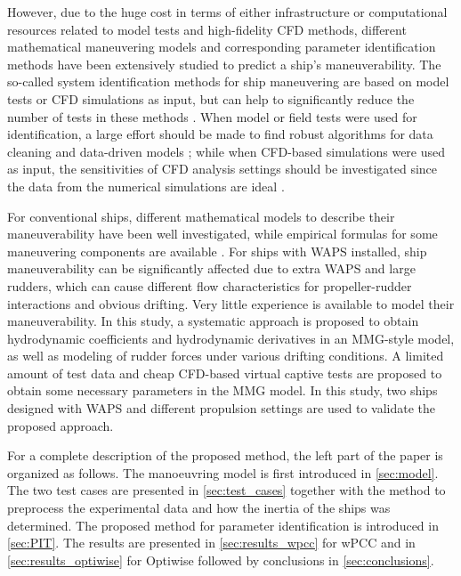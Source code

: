 However, due to the huge cost in terms of either infrastructure or computational resources related to model tests and high-fidelity CFD methods, different mathematical maneuvering models and corresponding parameter identification methods have been extensively studied to predict a ship’s maneuverability. The so-called system identification methods for ship maneuvering are based on model tests or CFD simulations as input, but can help to significantly reduce the number of tests in these methods \citep{lokukalugep.pereraSystemIdentificationVessel2016,alexanderssonSystemIdentificationPhysicsinformed2024b}. When model or field tests were used for identification, a large effort should be made to find robust algorithms for data cleaning and data-driven models \citep{revestidoherreroTwostepIdentificationNonlinear2012,alexanderssonSystemIdentificationVessel2022,duShipManeuveringPrediction2022}; while when CFD-based simulations were used as input, the sensitivities of CFD analysis settings should be investigated since the data from the numerical simulations are ideal \citep{liuPredictionsShipManeuverability2018}.

For conventional ships, different mathematical models to describe their maneuverability have been well investigated, while empirical formulas for some maneuvering components are available \citep{yasukawaIntroductionMMGStandard2015}. For ships with WAPS installed, ship maneuverability can be significantly affected due to extra WAPS and large rudders, which can cause different flow characteristics for propeller-rudder interactions and obvious drifting. Very little experience is available to model their maneuverability. In this study, a systematic approach is proposed to obtain hydrodynamic coefficients and hydrodynamic derivatives in an MMG-style model, as well as modeling of rudder forces under various drifting conditions. A limited amount of test data and cheap CFD-based virtual captive tests are proposed to obtain some necessary parameters in the MMG model. In this study, two ships designed with WAPS and different propulsion settings are used to validate the proposed approach. 

For a complete description of the proposed method, the left part of the paper is organized as follows. 
The manoeuvring model is first introduced in \autoref{sec:model}. The two test cases are presented in \autoref{sec:test_cases} together with the method to preprocess the experimental data and how the inertia of the ships was determined. The proposed method for parameter identification is introduced in \autoref{sec:PIT}. The results are presented in \autoref{sec:results_wpcc} for wPCC and in \autoref{sec:results_optiwise} for Optiwise followed by conclusions in \autoref{sec:conclusions}.



